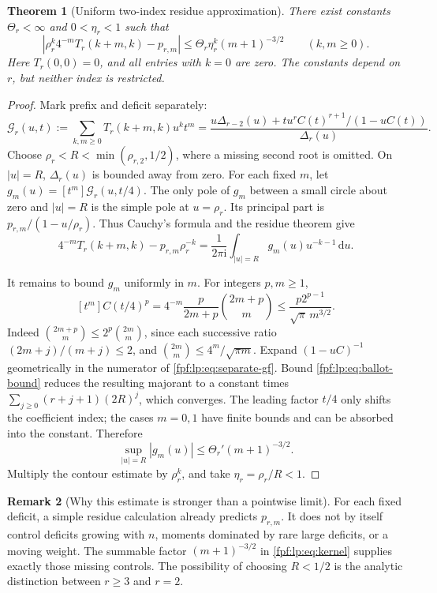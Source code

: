 \documentclass[11pt]{article}
\numberwithin{equation}{section}
\newtheorem{theorem}{Theorem}[section]
\theoremstyle{definition}
\newtheorem{remark}[theorem]{Remark}
\newcommand{\dd}{\mathrm d}
\newcommand{\ii}{\mathrm i}
\begin{document}
\begin{theorem}[Uniform two-index residue approximation]\label{fpf:lp:thm:kernel}
There exist constants \(\Theta_r<\infty\) and \(0<\eta_r<1\) such that
\begin{equation}\label{fpf:lp:eq:kernel}
 \boxed{\displaystyle
 \left|\rho_r^k4^{-m}T_r(k+m,k)-p_{r,m}\right|
 \le \Theta_r\eta_r^k(m+1)^{-3/2}\qquad(k,m\ge0).}
\end{equation}
Here \(T_r(0,0)=0\), and all entries with \(k=0\) are zero.
The constants depend on \(r\), but neither index is restricted.
\end{theorem}
\begin{proof}
Mark prefix and deficit separately:
\begin{equation}\label{fpf:lp:eq:separate-gf}
 \mathcal G_r(u,t):=\sum_{k,m\ge0}T_r(k+m,k)u^kt^m
 =\frac{u\Delta_{r-2}(u)+t u^rC(t)^{r+1}/(1-uC(t))}{\Delta_r(u)}.
\end{equation}
Choose
\(\rho_r<R<\min(\rho_{r,2},1/2)\), where a missing second root is
omitted. On \(|u|=R\), \(\Delta_r(u)\) is bounded away from zero.
For each fixed \(m\), let \(g_m(u)=[t^m]\mathcal G_r(u,t/4)\).
The only pole of \(g_m\) between a small circle about zero and
\(|u|=R\) is the simple pole at \(u=\rho_r\). Its principal part is
\(p_{r,m}/(1-u/\rho_r)\). Thus Cauchy's formula and the residue theorem
give
\[
 4^{-m}T_r(k+m,k)-p_{r,m}\rho_r^{-k}
 =\frac1{2\pi\ii}\int_{|u|=R}g_m(u)u^{-k-1}\,\dd u.
\]

It remains to bound \(g_m\) uniformly in \(m\). For integers \(p,m\ge1\),
\begin{equation}\label{fpf:lp:eq:ballot-bound}
 [t^m]C(t/4)^p
 =4^{-m}\frac{p}{2m+p}\binom{2m+p}{m}
 \le\frac{p2^{p-1}}{\sqrt\pi\,m^{3/2}}.
\end{equation}
Indeed \(\binom{2m+p}{m}\le2^p\binom{2m}{m}\), since each successive
ratio \((2m+j)/(m+j)\le2\), and
\(\binom{2m}{m}\le4^m/\sqrt{\pi m}\).
Expand \((1-uC)^{-1}\) geometrically in the numerator of
\eqref{fpf:lp:eq:separate-gf}. Bound \eqref{fpf:lp:eq:ballot-bound} reduces
the resulting majorant to a constant times
\(\sum_{j\ge0}(r+j+1)(2R)^j\), which converges. The leading factor
\(t/4\) only shifts the coefficient index; the cases \(m=0,1\) have
finite bounds and can be absorbed into the constant. Therefore
\[
 \sup_{|u|=R}|g_m(u)|\le \Theta_r'(m+1)^{-3/2}.
\]
Multiply the contour estimate by \(\rho_r^k\), and take
\(\eta_r=\rho_r/R<1\).
\end{proof}

\begin{remark}[Why this estimate is stronger than a pointwise limit]
\label{fpf:lp:rem:pointwise}
For each fixed deficit, a simple residue calculation already predicts
\(p_{r,m}\). It does not by itself control deficits growing with \(n\),
moments dominated by rare large deficits, or a moving weight. The summable
factor \((m+1)^{-3/2}\) in \eqref{fpf:lp:eq:kernel} supplies exactly those
missing controls. The possibility of choosing \(R<1/2\) is the analytic
distinction between \(r\ge3\) and \(r=2\).
\end{remark}
\end{document}
